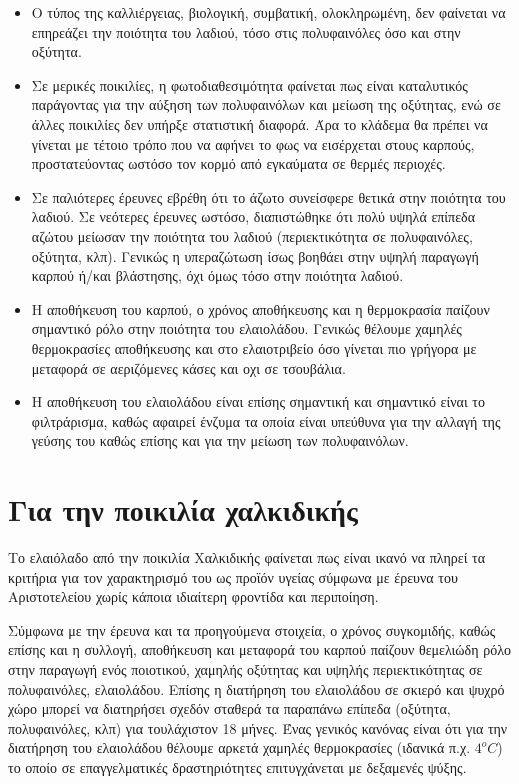 \documentclass[12pt,a4paper]{article}
\begin{document}
\begin{itemize}
    \item Ο τύπος της καλλιέργειας, βιολογική, συμβατική, ολοκληρωμένη, δεν φαίνεται να επηρεάζει την ποιότητα του λαδιού, τόσο στις πολυφαινόλες όσο και στην οξύτητα.  
    \item Σε μερικές ποικιλίες, η φωτοδιαθεσιμότητα φαίνεται πως είναι καταλυτικός παράγοντας για την αύξηση των πολυφαινόλων και μείωση της οξύτητας, ενώ σε άλλες ποικιλίες δεν υπήρξε στατιστική διαφορά. Άρα το κλάδεμα θα πρέπει να γίνεται με τέτοιο τρόπο που να αφήνει το φως να εισέρχεται στους καρπούς, προστατεύοντας ωστόσο τον κορμό από εγκαύματα σε θερμές περιοχές.  
    \item Σε παλιότερες έρευνες εβρέθη ότι το άζωτο συνείσφερε θετικά στην ποιότητα του λαδιού. Σε νεότερες έρευνες ωστόσο, διαπιστώθηκε ότι πολύ υψηλά επίπεδα αζώτου μείωσαν την ποιότητα του λαδιού (περιεκτικότητα σε πολυφαινόλες, οξύτητα, κλπ). Γενικώς η υπεραζώτωση ίσως βοηθάει στην υψηλή παραγωγή καρπού ή/και βλάστησης, όχι όμως τόσο στην ποιότητα λαδιού.
    \item  Η αποθήκευση του καρπού, ο χρόνος αποθήκευσης και η θερμοκρασία παίζουν σημαντικό ρόλο στην ποιότητα του ελαιολάδου. Γενικώς θέλουμε χαμηλές θερμοκρασίες αποθήκευσης και στο ελαιοτριβείο όσο γίνεται πιο γρήγορα με μεταφορά σε αεριζόμενες κάσες και οχι σε τσουβάλια.
    \item Η αποθήκευση του ελαιολάδου είναι επίσης σημαντική και σημαντικό είναι το φιλτράρισμα, καθώς αφαιρεί ένζυμα τα οποία είναι υπεύθυνα για την αλλαγή της γεύσης του καθώς επίσης και για την μείωση των πολυφαινόλων.

\end{itemize}
\section*{Για την ποικιλία χαλκιδικής}
Το ελαιόλαδο από την ποικιλία Χαλκιδικής φαίνεται πως είναι ικανό να πληρεί τα κριτήρια για τον χαρακτηρισμό του ως προϊόν υγείας σύμφωνα με έρευνα του Αριστοτελείου χωρίς κάποια ιδιαίτερη φροντίδα και περιποίηση. 

Σύμφωνα με την έρευνα και τα προηγούμενα στοιχεία, ο χρόνος συγκομιδής, καθώς επίσης και η συλλογή, αποθήκευση και μεταφορά του καρπού παίζουν θεμελιώδη ρόλο στην παραγωγή ενός ποιοτικού, χαμηλής οξύτητας και υψηλής περιεκτικότητας σε πολυφαινόλες, ελαιολάδου. Επίσης η διατήρηση του ελαιολάδου σε σκιερό και ψυχρό χώρο μπορεί να διατηρήσει σχεδόν σταθερά τα παραπάνω επίπεδα (οξύτητα, πολυφαινόλες, κλπ) για τουλάχιστον 18 μήνες. Ένας γενικός κανόνας είναι ότι για την διατήρηση του ελαιολάδου θέλουμε αρκετά χαμηλές θερμοκρασίες (ιδανικά π.χ. $4^{ο}C$) το οποίο σε επαγγελματικές δραστηριότητες επιτυγχάνεται με δεξαμενές ψύξης.
\end{document}
